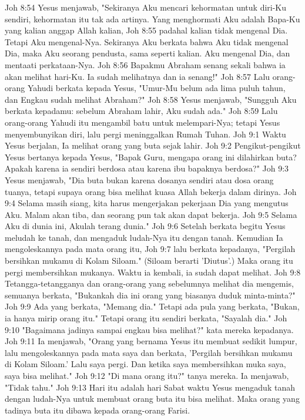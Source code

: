 Joh 8:54  Yesus menjawab, "Sekiranya Aku mencari kehormatan untuk diri-Ku sendiri, kehormatan itu tak ada artinya. Yang menghormati Aku adalah Bapa-Ku yang kalian anggap Allah kalian,
Joh 8:55  padahal kalian tidak mengenal Dia. Tetapi Aku mengenal-Nya. Sekiranya Aku berkata bahwa Aku tidak mengenal Dia, maka Aku seorang pendusta, sama seperti kalian. Aku mengenal Dia, dan mentaati perkataan-Nya.
Joh 8:56  Bapakmu Abraham senang sekali bahwa ia akan melihat hari-Ku. Ia sudah melihatnya dan ia senang!"
Joh 8:57  Lalu orang-orang Yahudi berkata kepada Yesus, "Umur-Mu belum ada lima puluh tahun, dan Engkau sudah melihat Abraham?"
Joh 8:58  Yesus menjawab, "Sungguh Aku berkata kepadamu: sebelum Abraham lahir, Aku sudah ada."
Joh 8:59  Lalu orang-orang Yahudi itu mengambil batu untuk melempari-Nya; tetapi Yesus menyembunyikan diri, lalu pergi meninggalkan Rumah Tuhan.
Joh 9:1  Waktu Yesus berjalan, Ia melihat orang yang buta sejak lahir.
Joh 9:2  Pengikut-pengikut Yesus bertanya kepada Yesus, "Bapak Guru, mengapa orang ini dilahirkan buta? Apakah karena ia sendiri berdosa atau karena ibu bapaknya berdosa?"
Joh 9:3  Yesus menjawab, "Dia buta bukan karena dosanya sendiri atau dosa orang tuanya, tetapi supaya orang bisa melihat kuasa Allah bekerja dalam dirinya.
Joh 9:4  Selama masih siang, kita harus mengerjakan pekerjaan Dia yang mengutus Aku. Malam akan tiba, dan seorang pun tak akan dapat bekerja.
Joh 9:5  Selama Aku di dunia ini, Akulah terang dunia."
Joh 9:6  Setelah berkata begitu Yesus meludah ke tanah, dan mengaduk ludah-Nya itu dengan tanah. Kemudian Ia mengoleskannya pada mata orang itu,
Joh 9:7  lalu berkata kepadanya, "Pergilah bersihkan mukamu di Kolam Siloam." (Siloam berarti 'Diutus'.) Maka orang itu pergi membersihkan mukanya. Waktu ia kembali, ia sudah dapat melihat.
Joh 9:8  Tetangga-tetangganya dan orang-orang yang sebelumnya melihat dia mengemis, semuanya berkata, "Bukankah dia ini orang yang biasanya duduk minta-minta?"
Joh 9:9  Ada yang berkata, "Memang dia." Tetapi ada pula yang berkata, "Bukan, ia hanya mirip orang itu." Tetapi orang itu sendiri berkata, "Sayalah dia."
Joh 9:10  "Bagaimana jadinya sampai engkau bisa melihat?" kata mereka kepadanya.
Joh 9:11  Ia menjawab, "Orang yang bernama Yesus itu membuat sedikit lumpur, lalu mengoleskannya pada mata saya dan berkata, 'Pergilah bersihkan mukamu di Kolam Siloam.' Lalu saya pergi. Dan ketika saya membersihkan muka saya, saya bisa melihat."
Joh 9:12  "Di mana orang itu?" tanya mereka. Ia menjawab, "Tidak tahu."
Joh 9:13  Hari itu adalah hari Sabat waktu Yesus mengaduk tanah dengan ludah-Nya untuk membuat orang buta itu bisa melihat. Maka orang yang tadinya buta itu dibawa kepada orang-orang Farisi.
